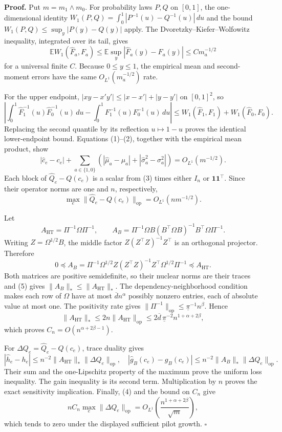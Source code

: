 \textbf{Proof.}
Put \(m=m_1\wedge m_0\).  For probability laws \(P,Q\) on \([0,1]\), the one-dimensional identity \(W_1(P,Q)=\int_0^1|P^{-1}(u)-Q^{-1}(u)|\,du\) and the bound \(W_1(P,Q)\le\sup_y|P(y)-Q(y)|\) apply.  The Dvoretzky--Kiefer--Wolfowitz inequality, integrated over its tail, gives
\[
\mathbb E W_1(\widehat F_a,F_a)
\le\mathbb E\sup_y|\widehat F_a(y)-F_a(y)|
\le C m_a^{-1/2} \tag{1}
\]
for a universal finite \(C\).  Because \(0\le y\le1\), the empirical mean and second-moment errors have the same \(O_{L^1}(m_a^{-1/2})\) rate.

For the upper endpoint, \(|xy-x'y'|\le|x-x'|+|y-y'|\) on \([0,1]^2\), so
\[
\left|\int_0^1\widehat F_1^{-1}(u)\widehat F_0^{-1}(u)\,du
-\int_0^1F_1^{-1}(u)F_0^{-1}(u)\,du\right|
\le W_1(\widehat F_1,F_1)+W_1(\widehat F_0,F_0). \tag{2}
\]
Replacing the second quantile by its reflection \(u\mapsto1-u\) proves the identical lower-endpoint bound.  Equations (1)--(2), together with the empirical mean product, show
\[
|\widehat c_e-c_e|+\sum_{a\in\{1,0\}}
(|\widehat\mu_a-\mu_a|+|\widehat\sigma_a^2-\sigma_a^2|)
=O_{L^1}(m^{-1/2}). \tag{3}
\]
Each block of \(\widehat Q_e-Q(c_e)\) is a scalar from (3) times either \(I_n\) or \(\mathbf1\mathbf1^{\top}\).  Since their operator norms are one and \(n\), respectively,
\[
\max_e\lVert\widehat Q_e-Q(c_e)\rVert_{\mathrm{op}}
=O_{L^1}(nm^{-1/2}). \tag{4}
\]

Let
\[
A_{\mathrm{HT}}=\Pi^{-1}\Omega\Pi^{-1},
\qquad
A_B=\Pi^{-1}\Omega B(B^{\top}\Omega B)^{-1}B^{\top}\Omega\Pi^{-1}.
\]
Writing \(Z=\Omega^{1/2}B\), the middle factor
\(Z(Z^{\top}Z)^{-1}Z^{\top}\) is an orthogonal projector.  Therefore
\[
0\preceq A_B
=\Pi^{-1}\Omega^{1/2}
Z(Z^{\top}Z)^{-1}Z^{\top}
\Omega^{1/2}\Pi^{-1}
\preceq A_{\mathrm{HT}}. \tag{5}
\]
Both matrices are positive semidefinite, so their nuclear norms are their traces and (5) gives \(\lVert A_B\rVert_*\le\lVert A_{\mathrm{HT}}\rVert_*\).  The dependency-neighborhood condition makes each row of \(\Omega\) have at most \(\overline d n^\alpha\) possibly nonzero entries, each of absolute value at most one.  The positivity rate gives \(\lVert\Pi^{-1}\rVert_{\mathrm{op}}\le\underline\pi^{-1}n^\beta\).  Hence
\[
\lVert A_{\mathrm{HT}}\rVert_*
\le2n\lVert A_{\mathrm{HT}}\rVert_{\mathrm{op}}
\le2\overline d\,\underline\pi^{-2}n^{1+\alpha+2\beta},
\]
which proves \(C_n=O(n^{\alpha+2\beta-1})\).

For \(\Delta Q_e=\widehat Q_e-Q(c_e)\), trace duality gives
\[
|\widehat h_e-h_e|\le n^{-2}\lVert A_{\mathrm{HT}}\rVert_*\lVert\Delta Q_e\rVert_{\mathrm{op}},
\quad
|\widehat g_B(c_e)-g_B(c_e)|
\le n^{-2}\lVert A_B\rVert_*\lVert\Delta Q_e\rVert_{\mathrm{op}}.
\]
Their sum and the one-Lipschitz property of the maximum prove the uniform loss inequality.  The gain inequality is its second term.  Multiplication by \(n\) proves the exact sensitivity implication.  Finally, (4) and the bound on \(C_n\) give
\[
nC_n\max_e\lVert\Delta Q_e\rVert_{\mathrm{op}}
=O_{L^1}\!\left(\frac{n^{1+\alpha+2\beta}}{\sqrt m}\right),
\]
which tends to zero under the displayed sufficient pilot growth. \(\square\)